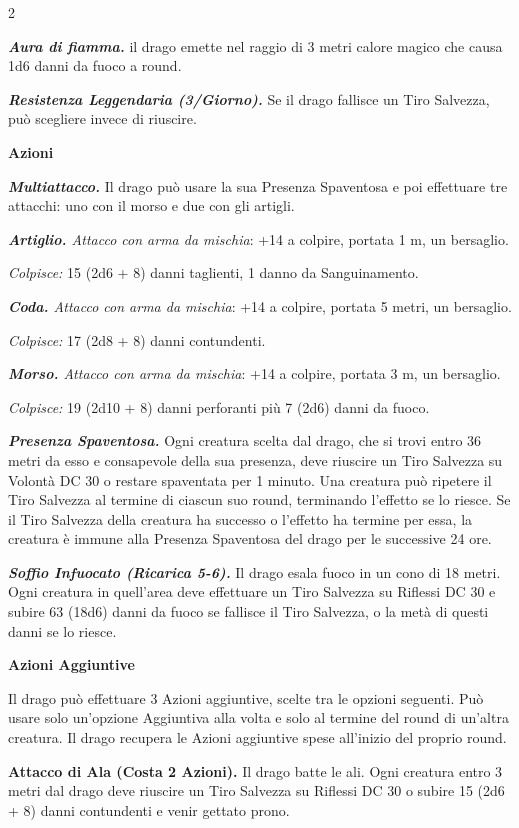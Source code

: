 \begin{multicols}{2}
{\emph{\textbf{Aura di fiamma.}} il drago emette nel raggio di 3 metri calore magico che causa 1d6 danni da fuoco a round.

\emph{\textbf{Resistenza Leggendaria (3/Giorno).}} Se il drago fallisce un Tiro Salvezza, può scegliere invece di riuscire.

\textbf{Azioni}

\emph{\textbf{Multiattacco.}} Il drago può usare la sua Presenza Spaventosa e poi effettuare tre attacchi: uno con il morso e due con gli artigli.

\emph{\textbf{Artiglio.} Attacco con arma da mischia}: +14 a colpire, portata 1 m, un bersaglio.

\emph{Colpisce:} 15 (2d6 + 8) danni taglienti, 1 danno da Sanguinamento.

\emph{\textbf{Coda.} Attacco con arma da mischia}: +14 a colpire, portata 5 metri, un bersaglio.

\emph{Colpisce:} 17 (2d8 + 8) danni contundenti.

\emph{\textbf{Morso.} Attacco con arma da mischia}: +14 a colpire, portata 3 m, un bersaglio.

\emph{Colpisce:} 19 (2d10 + 8) danni perforanti più 7 (2d6) danni da fuoco.

\emph{\textbf{Presenza Spaventosa.}} Ogni creatura scelta dal drago, che si trovi entro 36 metri da esso e consapevole della sua presenza, deve riuscire un Tiro Salvezza su Volontà DC 30 o restare spaventata per 1 minuto. Una creatura può ripetere il Tiro Salvezza al termine di ciascun suo round, terminando l'effetto se lo riesce. Se il Tiro Salvezza della creatura ha successo o l'effetto ha termine per essa, la creatura è immune alla Presenza Spaventosa del drago per le successive 24 ore.

\emph{\textbf{Soffio Infuocato (Ricarica 5-6).}} Il drago esala fuoco in un cono di 18 metri. Ogni creatura in quell'area deve effettuare un Tiro Salvezza su Riflessi DC 30 e subire 63 (18d6) danni da fuoco se fallisce il Tiro Salvezza, o la metà di questi danni se lo riesce.

\textbf{Azioni Aggiuntive}

Il drago può effettuare 3 Azioni aggiuntive, scelte tra le opzioni seguenti. Può usare solo un'opzione Aggiuntiva alla volta e solo al termine del round di un'altra creatura. Il drago recupera le Azioni aggiuntive spese all'inizio del proprio round.

\textbf{Attacco di Ala (Costa 2 Azioni).} Il drago batte le ali. Ogni creatura entro 3 metri dal drago deve riuscire un Tiro Salvezza su Riflessi DC 30 o subire 15 (2d6 + 8) danni contundenti e venir gettato prono.

}
\end{multicols}
